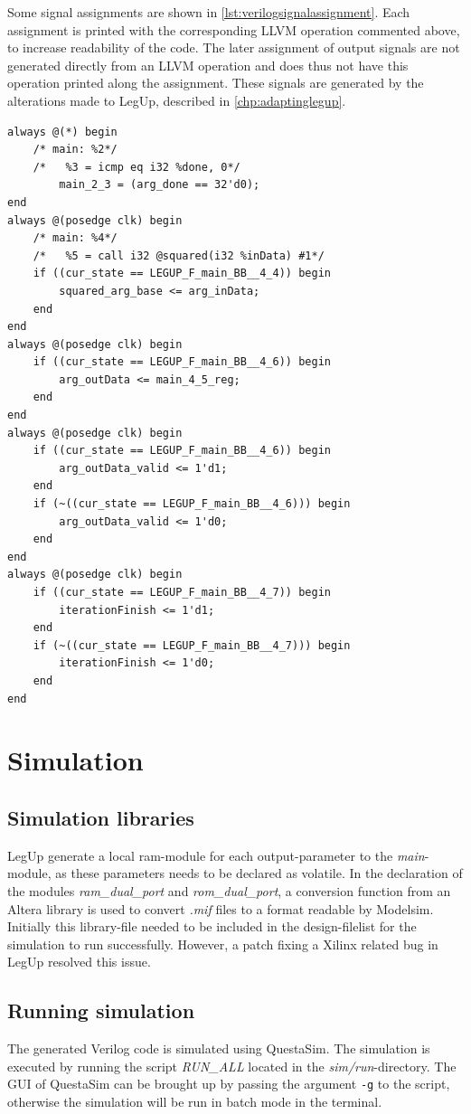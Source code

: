 Some signal assignments are shown in \cref{lst:verilogsignalassignment}. Each assignment is printed with the corresponding LLVM operation commented above, to increase readability of the code. The later assignment of output signals are not generated directly from an LLVM operation and does thus not have this operation printed along the assignment. These signals are generated by the alterations made to LegUp, described in \cref{chp:adaptinglegup}.
\begin{lstlisting}[caption={Verilog FSM},label=lst:verilogsignalassignment]
always @(*) begin
	/* main: %2*/
	/*   %3 = icmp eq i32 %done, 0*/
		main_2_3 = (arg_done == 32'd0);
end
always @(posedge clk) begin
	/* main: %4*/
	/*   %5 = call i32 @squared(i32 %inData) #1*/
	if ((cur_state == LEGUP_F_main_BB__4_4)) begin
		squared_arg_base <= arg_inData;
	end
end
always @(posedge clk) begin
	if ((cur_state == LEGUP_F_main_BB__4_6)) begin
		arg_outData <= main_4_5_reg;
	end
end
always @(posedge clk) begin
	if ((cur_state == LEGUP_F_main_BB__4_6)) begin
		arg_outData_valid <= 1'd1;
	end
	if (~((cur_state == LEGUP_F_main_BB__4_6))) begin
		arg_outData_valid <= 1'd0;
	end
end
always @(posedge clk) begin
	if ((cur_state == LEGUP_F_main_BB__4_7)) begin
		iterationFinish <= 1'd1;
	end
	if (~((cur_state == LEGUP_F_main_BB__4_7))) begin
		iterationFinish <= 1'd0;
	end
end
\end{lstlisting}

\section{Simulation}
\subsection{Simulation libraries}

LegUp generate a local \gls{ram}-module for each output-parameter to the \textit{main}-module, as these parameters needs to be declared as volatile. In the declaration of the modules \textit{ram\_dual\_port} and \textit{rom\_dual\_port}, a conversion function from an Altera library is used to convert \textit{.mif} files to a format readable by Modelsim. Initially this library-file needed to be included in the design-filelist for the simulation to run successfully. However, a patch fixing a Xilinx related bug in LegUp \cite{legupxilinx} resolved this issue.

\subsection{Running simulation}
The generated Verilog code is simulated using QuestaSim. The simulation is executed by running the script \textit{RUN\_ALL} located in the \textit{sim/run}-directory. The GUI of QuestaSim can be brought up by passing the argument \verb!-g! to the script, otherwise the simulation will be run in batch mode in the terminal.

